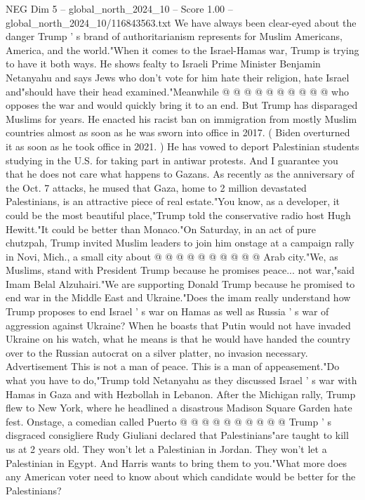 \begin{textsample}{NEG Dim 5 – global\_north\_2024\_10 – Score 1.00 – global\_north\_2024\_10/116843563.txt}
We have always been clear-eyed about the danger Trump ' s brand of authoritarianism represents for Muslim Americans, America, and the world."When it comes to the Israel-Hamas war, Trump is trying to have it both ways.
He shows fealty to Israeli Prime Minister Benjamin Netanyahu and says Jews who don't vote for him hate their religion, hate Israel and"should have their head examined."Meanwhile @ @ @ @ @ @ @ @ @ @ who opposes the war and would quickly bring it to an end.
But Trump has disparaged Muslims for years.
He enacted his racist ban on immigration from mostly Muslim countries almost as soon as he was sworn into office in 2017. ( Biden overturned it as soon as he took office in 2021. ) He has vowed to deport Palestinian students studying in the U.S. for taking part in antiwar protests.
And I guarantee you that he does not care what happens to Gazans.
As recently as the anniversary of the Oct. 7 attacks, he mused that Gaza, home to 2 million devastated Palestinians, is an attractive piece of real estate."You know, as a developer, it could be the most beautiful place,"Trump told the conservative radio host Hugh Hewitt."It could be better than Monaco."On Saturday, in an act of pure chutzpah, Trump invited Muslim leaders to join him onstage at a campaign rally in Novi, Mich., a small city about @ @ @ @ @ @ @ @ @ @ Arab city."We, as Muslims, stand with President Trump because he promises peace... not war,"said Imam Belal Alzuhairi."We are supporting Donald Trump because he promised to end war in the Middle East and Ukraine."Does the imam really understand how Trump proposes to end Israel ' s war on Hamas as well as Russia ' s war of aggression against Ukraine?
When he boasts that Putin would not have invaded Ukraine on his watch, what he means is that he would have handed the country over to the Russian autocrat on a silver platter, no invasion necessary.
Advertisement This is not a man of peace.
This is a man of appeasement."Do what you have to do,"Trump told Netanyahu as they discussed Israel ' s war with Hamas in Gaza and with Hezbollah in Lebanon.
After the Michigan rally, Trump flew to New York, where he headlined a disastrous Madison Square Garden hate fest.
Onstage, a comedian called Puerto @ @ @ @ @ @ @ @ @ @ Trump ' s disgraced consigliere Rudy Giuliani declared that Palestinians"are taught to kill us at 2 years old.
They won't let a Palestinian in Jordan.
They won't let a Palestinian in Egypt.
And Harris wants to bring them to you."What more does any American voter need to know about which candidate would be better for the Palestinians?

\end{textsample}
